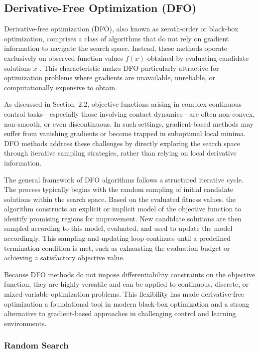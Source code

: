 \subsection{Derivative-Free Optimization (DFO)}

Derivative-free optimization (DFO), also known as zeroth-order or black-box optimization, comprises a class of algorithms that do not rely on gradient information to navigate the search space. Instead, these methods operate exclusively on observed function values $f(x)$ obtained by evaluating candidate solutions $x$ \citep{conn2009dfo,kolda2003directsearch,rios2013derivativefree}. This characteristic makes DFO particularly attractive for optimization problems where gradients are unavailable, unreliable, or computationally expensive to obtain.

As discussed in Section~2.2, objective functions arising in complex continuous control tasks—especially those involving contact dynamics—are often non-convex, non-smooth, or even discontinuous. In such settings, gradient-based methods may suffer from vanishing gradients or become trapped in suboptimal local minima. DFO methods address these challenges by directly exploring the search space through iterative sampling strategies, rather than relying on local derivative information.

The general framework of DFO algorithms follows a structured iterative cycle. The process typically begins with the random sampling of initial candidate solutions within the search space. Based on the evaluated fitness values, the algorithm constructs an explicit or implicit model of the objective function to identify promising regions for improvement. New candidate solutions are then sampled according to this model, evaluated, and used to update the model accordingly. This sampling-and-updating loop continues until a predefined termination condition is met, such as exhausting the evaluation budget or achieving a satisfactory objective value.

Because DFO methods do not impose differentiability constraints on the objective function, they are highly versatile and can be applied to continuous, discrete, or mixed-variable optimization problems. This flexibility has made derivative-free optimization a foundational tool in modern black-box optimization and a strong alternative to gradient-based approaches in challenging control and learning environments.

\subsubsection{Random Search}

